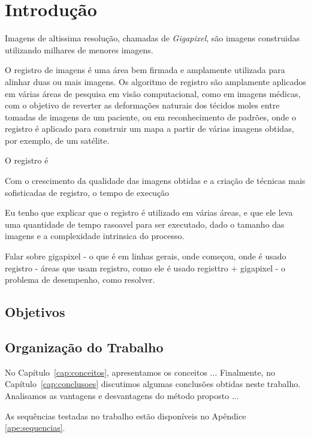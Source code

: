\chapter{Introdução}
\label{cap:introducao}

	Imagens de altissima resolução, chamadas de \textit{Gigapixel}, são imagens construidas utilizando milhares de 
menores imagens. 

	O registro de imagens é uma área bem firmada e amplamente utilizada para alinhar duas ou mais imagens. Os algoritmo 
de registro são amplamente aplicados em várias áreas de pesquisa em visão computacional, como em imagens médicas, com o 
objetivo de reverter as deformações naturais dos técidos moles entre tomadas de imagens de um paciente, ou em 
reconhecimento de padrões, onde o registro é aplicado para construir um mapa a partir de várias imagens 
obtidas, por exemplo, de um satélite.

	O registro é

	Com o crescimento da qualidade das imagens obtidas e a criação de técnicas mais sofisticadas de registro,
o tempo de execução 



Eu tenho que explicar que o registro é utilizado em várias áreas, e que ele leva uma quantidade de tempo
rasoavel para ser executado, dado o tamanho das imagens e a complexidade intrinsica do processo.


Falar sobre
gigapixel - o que é em linhas gerais, onde começou, onde é usado
registro - áreas que usam registro, como ele é usado
registtro + gigapixel - o problema de desempenho, como resolver.


\section{Objetivos}
\label{sec:objetivo}

\section{Organização do Trabalho}
\label{sec:organizacao_trabalho}

No Capítulo~\ref{cap:conceitos}, apresentamos os conceitos ... Finalmente, no
Capítulo~\ref{cap:conclusoes} discutimos algumas conclusões obtidas neste
trabalho. Analisamos as vantagens e desvantagens do método proposto ... 

As sequências testadas no trabalho estão disponíveis no Apêndice \ref{ape:sequencias}.
